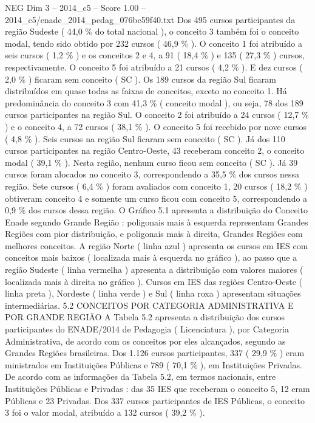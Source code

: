 \begin{textsample}{NEG Dim 3 – 2014\_c5 – Score 1.00 – 2014\_c5/enade\_2014\_pedag\_076bc59f40.txt}
Dos 495 cursos participantes da região Sudeste ( 44,0 \% do total nacional ), o conceito 3 também foi o conceito modal, tendo sido obtido por 232 cursos ( 46,9 \% ).
O conceito 1 foi atribuído a seis cursos ( 1,2 \% ) e os conceitos 2 e 4, a 91 ( 18,4 \% ) e 135 ( 27,3 \% ) cursos, respectivamente.
O conceito 5 foi atribuído a 21 cursos ( 4,2 \% ).
E dez cursos ( 2,0 \% ) ficaram sem conceito ( SC ).
Os 189 cursos da região Sul ficaram distribuídos em quase todas as faixas de conceitos, exceto no conceito 1.
Há predominância do conceito 3 com 41,3 \% ( conceito modal ), ou seja, 78 dos 189 cursos participantes na região Sul.
O conceito 2 foi atribuído a 24 cursos ( 12,7 \% ) e o conceito 4, a 72 cursos ( 38,1 \% ).
O conceito 5 foi recebido por nove cursos ( 4,8 \% ).
Seis cursos na região Sul ficaram sem conceito ( SC ).
Já dos 110 cursos participantes na região Centro-Oeste, 43 receberam conceito 2, o conceito modal ( 39,1 \% ).
Nesta região, nenhum curso ficou sem conceito ( SC ).
Já 39 cursos foram alocados no conceito 3, correspondendo a 35,5 \% dos cursos nessa região.
Sete cursos ( 6,4 \% ) foram avaliados com conceito 1, 20 cursos ( 18,2 \% ) obtiveram conceito 4 e somente um curso ficou com conceito 5, correspondendo a 0,9 \% dos cursos dessa região.
O Gráfico 5.1 apresenta a distribuição do Conceito Enade segundo Grande Região : poligonais mais à esquerda representam Grandes Regiões com pior distribuição, e poligonais mais à direita, Grandes Regiões com melhores conceitos.
A região Norte ( linha azul ) apresenta os cursos em IES com conceitos mais baixos ( localizada mais à esquerda no gráfico ), ao passo que a região Sudeste ( linha vermelha ) apresenta a distribuição com valores maiores ( localizada mais à direita no gráfico ).
Cursos em IES das regiões Centro-Oeste ( linha preta ), Nordeste ( linha verde ) e Sul ( linha roxa ) apresentam situações intermediárias. 5.2 CONCEITOS POR CATEGORIA ADMINISTRATIVA E POR GRANDE REGIÃO A Tabela 5.2 apresenta a distribuição dos cursos participantes do ENADE/2014 de Pedagogia ( Licenciatura ), por Categoria Administrativa, de acordo com os conceitos por eles alcançados, segundo as Grandes Regiões brasileiras.
Dos 1.126 cursos participantes, 337 ( 29,9 \% ) eram ministrados em Instituições Públicas e 789 ( 70,1 \% ), em Instituições Privadas.
De acordo com as informações da Tabela 5.2, em termos nacionais, entre Instituições Públicas e Privadas : das 35 IES que receberam o conceito 5, 12 eram Públicas e 23 Privadas.
Dos 337 cursos participantes de IES Públicas, o conceito 3 foi o valor modal, atribuído a 132 cursos ( 39,2 \% ).

\end{textsample}
